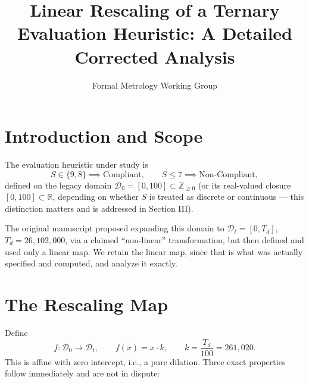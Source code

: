 \documentclass[10pt,journal,compsoc]{IEEEtran}
\begin{document}
\title{Linear Rescaling of a Ternary Evaluation Heuristic: A Detailed Corrected Analysis}
\author{Formal Metrology Working Group}


\maketitle

\section{Introduction and Scope}
The evaluation heuristic under study is
\begin{equation}
    S \in \{9,8\} \implies \text{Compliant}, \qquad S \le 7 \implies \text{Non-Compliant},
\end{equation}
defined on the legacy domain $\mathcal{D}_0 = [0,100] \subset \mathbb{Z}_{\ge 0}$ (or its real-valued closure $[0,100]\subset\mathbb{R}$, depending on whether $S$ is treated as discrete or continuous — this distinction matters and is addressed in Section III).

The original manuscript proposed expanding this domain to $\mathcal{D}_t = [0,T_d]$, $T_d = 26{,}102{,}000$, via a claimed ``non-linear'' transformation, but then defined and used only a linear map. We retain the linear map, since that is what was actually specified and computed, and analyze it exactly.

\section{The Rescaling Map}
Define
\begin{equation}
    f : \mathcal{D}_0 \to \mathcal{D}_t, \qquad f(x) = x\cdot k, \qquad k = \frac{T_d}{100} = 261{,}020.
\end{equation}
This is affine with zero intercept, i.e., a pure dilation. Three exact properties follow immediately and are not in dispute:
\end{document}
